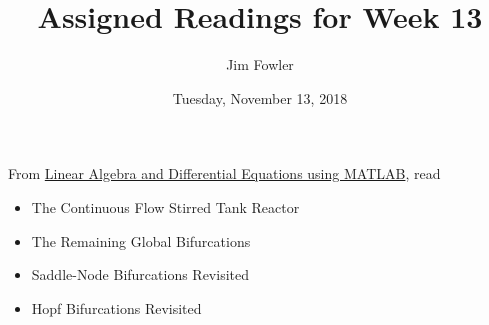 \documentclass{homework}
\author{Jim Fowler}
\title{Assigned Readings for Week 13}
\date{Tuesday, November 13, 2018}
\begin{document}
\maketitle

From \href{/courses/43735/files/folder/textbooks}{Linear Algebra and Differential Equations using MATLAB}, read 
\begin{itemize}
\item {} The Continuous Flow Stirred Tank Reactor
\item {} The Remaining Global Bifurcations
\item {} Saddle-Node Bifurcations Revisited
\item {} Hopf Bifurcations Revisited
\end{itemize}
\end{document}
